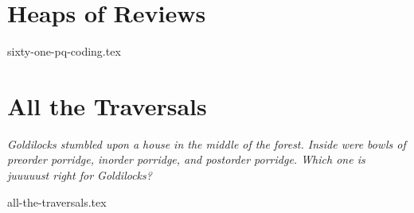\documentclass[11pt]{exam}
\begin{document}

\pagebreak
\section{Heaps of Reviews}
\begin{questions}
{sixty-one-pq-coding.tex}
\end{questions}


\pagebreak
\section{All the Traversals}
\emph{Goldilocks stumbled upon a house in the middle of the forest. Inside were bowls of preorder porridge, inorder porridge, and postorder porridge. Which one is juuuuust right for Goldilocks?}
\begin{questions}
{all-the-traversals.tex}
\end{questions}
\end{document}
